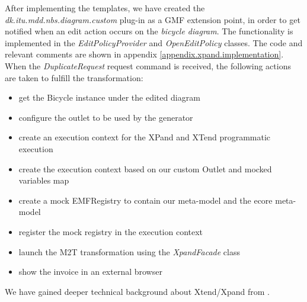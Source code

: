 \noindent After implementing the templates, we have created the
\emph{dk.itu.mdd.nbs.diagram.custom} plug-in as a GMF extension point, in order
to get notified when an edit action occurs on the \emph{bicycle diagram}. The
functionality is implemented in the \emph{EditPolicyProvider} and
\emph{OpenEditPolicy} classes. The code and relevant comments are shown in
appendix \ref{appendix.xpand.implementation}. When the \emph{DuplicateRequest} request command is received,
the following actions are taken to fulfill the transformation:
\begin{itemize}
  \item get the Bicycle instance under the edited diagram
  \item configure the outlet to be used by the generator
  \item create an execution context for the XPand and XTend programmatic
  execution
  \item create the execution context based on our custom Outlet and
  mocked variables map
  \item create a mock EMFRegistry to contain our meta-model and the
  ecore meta-model
  \item register the mock registry in the execution context
  \item launch the M2T transformation using the \emph{XpandFacade} class
  \item show the invoice in an external browser\\
\end{itemize}

\noindent We have gained deeper technical background about Xtend/Xpand from
\cite{XPAND_EXAMPLE}.
